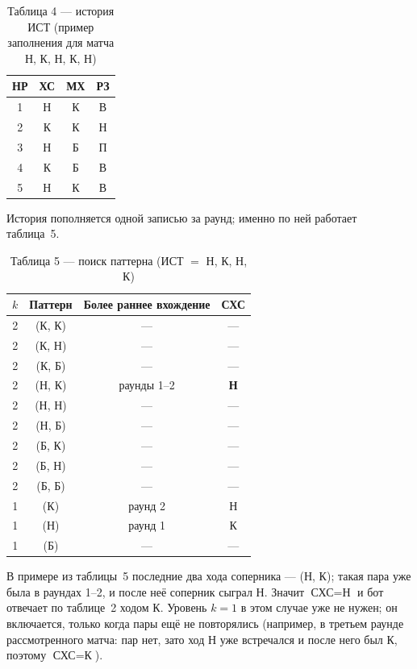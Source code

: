\documentclass[a4paper,14pt]{extarticle}
\begin{document}
\begin{table}[H]
\centering
\caption{Таблица 4 --- история ИСТ (пример заполнения для матча Н, К, Н, К, Н)}
\label{tab:t4}
\begin{tabular}{|c|c|c|c|}
\hline
\textbf{НР} & \textbf{ХС} & \textbf{МХ} & \textbf{РЗ}\\
\hline
1 & Н & К & В\\
\hline
2 & К & К & Н\\
\hline
3 & Н & Б & П\\
\hline
4 & К & Б & В\\
\hline
5 & Н & К & В\\
\hline
\end{tabular}
\end{table}

История пополняется одной записью за раунд; именно по ней работает
таблица~5.

\begin{table}[H]
\centering
\caption{Таблица 5 --- поиск паттерна (ИСТ $=$ Н, К, Н, К)}
\label{tab:t5}
\begin{tabular}{|c|c|c|c|}
\hline
\textbf{$k$} & \textbf{Паттерн} & \textbf{Более раннее вхождение} & \textbf{СХС}\\
\hline\hline
2 & (К, К) & --- & ---\\
\hline
2 & (К, Н) & --- & ---\\
\hline
2 & (К, Б) & --- & ---\\
\hline
2 & (Н, К) & раунды 1--2 & \textbf{Н}\\
\hline
2 & (Н, Н) & --- & ---\\
\hline
2 & (Н, Б) & --- & ---\\
\hline
2 & (Б, К) & --- & ---\\
\hline
2 & (Б, Н) & --- & ---\\
\hline
2 & (Б, Б) & --- & ---\\
\hline\hline
1 & (К) & раунд 2 & Н\\
\hline
1 & (Н) & раунд 1 & К\\
\hline
1 & (Б) & --- & ---\\
\hline
\end{tabular}
\end{table}

В примере из таблицы~5 последние два хода соперника --- (Н, К); такая пара уже
была в раундах 1--2, и после неё соперник сыграл Н. Значит $\text{СХС}=\text{Н}$
и бот отвечает по таблице~2 ходом К. Уровень $k=1$ в этом случае уже не нужен;
он включается, только когда пары ещё не повторялись (например, в третьем
раунде рассмотренного матча: пар нет, зато ход Н уже встречался и после него
был К, поэтому $\text{СХС}=\text{К}$).
\end{document}
